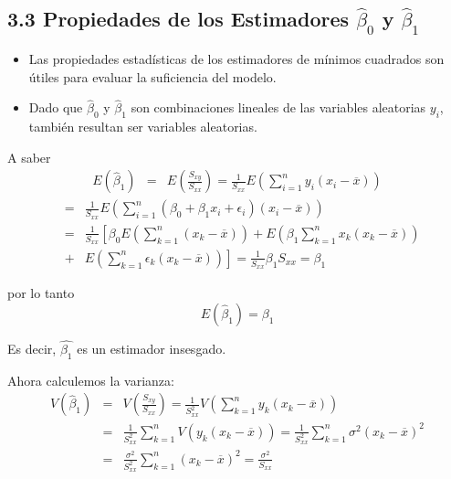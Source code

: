 \subsection{3.3 Propiedades de los Estimadores $\hat{\beta}_{0}$ y $\hat{\beta}_{1}$}


\begin{Note}
\begin{itemize}
\item Las propiedades estad\'isticas de los estimadores de m\'inimos cuadrados son \'utiles para evaluar la suficiencia del modelo.

\item Dado que $\hat{\beta}_{0}$ y  $\hat{\beta}_{1}$ son combinaciones lineales de las variables aleatorias $y_{i}$, tambi\'en resultan ser variables aleatorias.
\end{itemize}
\end{Note}
A saber
\begin{eqnarray*}
E\left(\hat{\beta}_{1}\right)&=&E\left(\frac{S_{xy}}{S_{xx}}\right)=\frac{1}{S_{xx}}E\left(\sum_{i=1}^{n}y_{i}\left(x_{i}-\overline{x}\right)\right)
\end{eqnarray*}
\begin{eqnarray*}
&=&\frac{1}{S_{xx}}E\left(\sum_{i=1}^{n}\left(\beta_{0}+\beta_{1}x_{i}+\epsilon_{i}\right)\left(x_{i}-\overline{x}\right)\right)\\
&=&\frac{1}{S_{xx}}\left[\beta_{0}E\left(\sum_{k=1}^{n}\left(x_{k}-\overline{x}\right)\right)+E\left(\beta_{1}\sum_{k=1}^{n}x_{k}\left(x_{k}-\overline{x}\right)\right)\right.\\
&+&\left.E\left(\sum_{k=1}^{n}\epsilon_{k}\left(x_{k}-\overline{x}\right)\right)\right]=\frac{1}{S_{xx}}\beta_{1}S_{xx}=\beta_{1}
\end{eqnarray*}






por lo tanto 
\begin{equation}\label{Esperanza.Beta.1}
E\left(\hat{\beta}_{1}\right)=\beta_{1}
\end{equation}
\begin{Note}
Es decir, $\hat{\beta_{1}}$ es un estimador insesgado.
\end{Note}
Ahora calculemos la varianza:
\begin{eqnarray*}
V\left(\hat{\beta}_{1}\right)&=&V\left(\frac{S_{xy}}{S_{xx}}\right)=\frac{1}{S_{xx}^{2}}V\left(\sum_{k=1}^{n}y_{k}\left(x_{k}-\overline{x}\right)\right)\\
&=&\frac{1}{S_{xx}^{2}}\sum_{k=1}^{n}V\left(y_{k}\left(x_{k}-\overline{x}\right)\right)=\frac{1}{S_{xx}^{2}}\sum_{k=1}^{n}\sigma^{2}\left(x_{k}-\overline{x}\right)^{2}\\
&=&\frac{\sigma^{2}}{S_{xx}^{2}}\sum_{k=1}^{n}\left(x_{k}-\overline{x}\right)^{2}=\frac{\sigma^{2}}{S_{xx}}
\end{eqnarray*}






